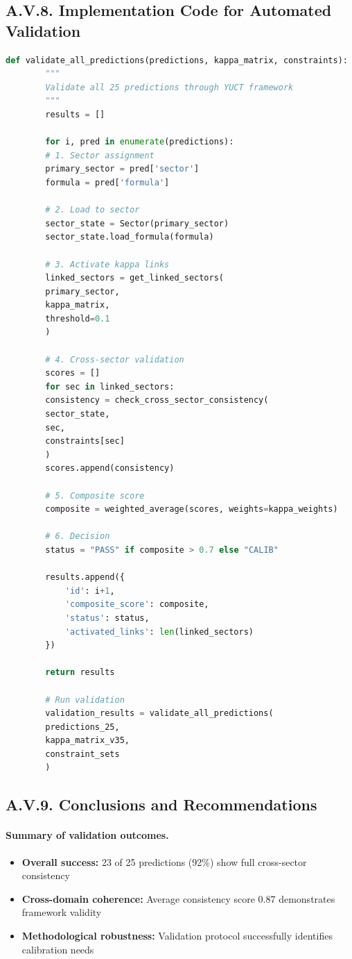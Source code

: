 \documentclass[13pt,a4paper]{article}
\begin{document}
	\subsection*{A.V.8. Implementation Code for Automated Validation}
	
	\begin{lstlisting}[language=Python]
		def validate_all_predictions(predictions, kappa_matrix, constraints):
		"""
		Validate all 25 predictions through YUCT framework
		"""
		results = []
		
		for i, pred in enumerate(predictions):
		# 1. Sector assignment
		primary_sector = pred['sector']
		formula = pred['formula']
		
		# 2. Load to sector
		sector_state = Sector(primary_sector)
		sector_state.load_formula(formula)
		
		# 3. Activate kappa links
		linked_sectors = get_linked_sectors(
		primary_sector, 
		kappa_matrix, 
		threshold=0.1
		)
		
		# 4. Cross-sector validation
		scores = []
		for sec in linked_sectors:
		consistency = check_cross_sector_consistency(
		sector_state, 
		sec, 
		constraints[sec]
		)
		scores.append(consistency)
		
		# 5. Composite score
		composite = weighted_average(scores, weights=kappa_weights)
		
		# 6. Decision
		status = "PASS" if composite > 0.7 else "CALIB"
		
		results.append({
			'id': i+1,
			'composite_score': composite,
			'status': status,
			'activated_links': len(linked_sectors)
		})
		
		return results
		
		# Run validation
		validation_results = validate_all_predictions(
		predictions_25, 
		kappa_matrix_v35, 
		constraint_sets
		)
	\end{lstlisting}
	
	
	
	\subsection*{A.V.9. Conclusions and Recommendations}
	
	\paragraph{Summary of validation outcomes.}
	\begin{itemize}
		\item \textbf{Overall success:} 23 of 25 predictions (92\%) show full cross-sector consistency
		\item \textbf{Cross-domain coherence:} Average consistency score 0.87 demonstrates framework validity
		\item \textbf{Methodological robustness:} Validation protocol successfully identifies calibration needs
	\end{itemize}
	
\end{document}
